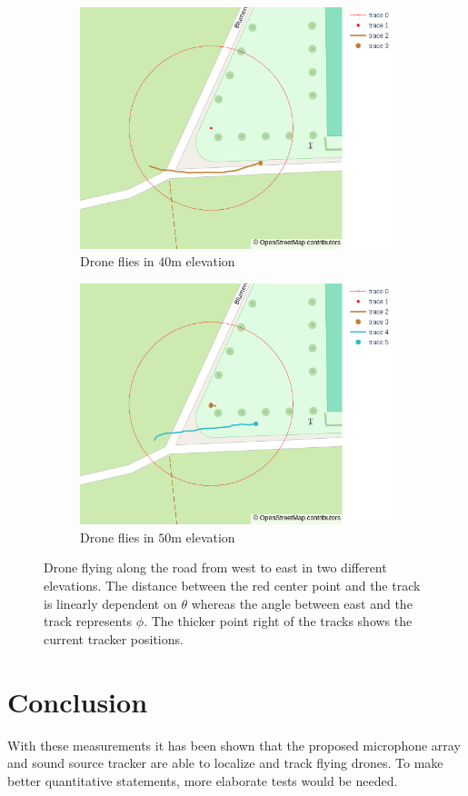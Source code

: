 \begin{figure}[h]
	\centering
	\begin{subfigure}[t]{0.45\textwidth}
		\centering
		\includegraphics[width=\textwidth]{images/7_measurements/we_low.png}
		\caption{Drone flies in $40$m elevation}
		\label{meas:fig:west east low}
	\end{subfigure}
	\hfill
	\begin{subfigure}[t]{0.45\textwidth}
		\centering
		\includegraphics[width=\textwidth]{images/7_measurements/we_high.png}
		\caption{Drone flies in $50$m elevation}
		\label{meas:fig:west east high}
	\end{subfigure}
	\caption{Drone flying along the road from west to east in two different
    elevations.
    The distance between the red center point and the track is linearly 
    dependent on $\theta$ whereas the angle between east and the track represents $\phi$.
    The thicker point right of the tracks shows the current tracker positions.}
	\label{meas:fig:west east}
\end{figure}

\section*{Conclusion}
With these measurements it has been shown that the proposed microphone 
array and sound source tracker are able 
to localize and track flying drones.
To make better quantitative statements, more elaborate tests
would be needed.